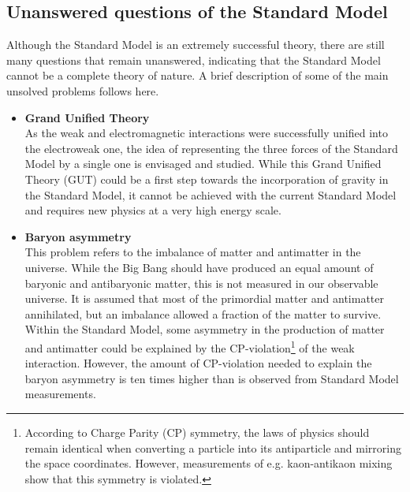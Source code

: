 \subsection{Unanswered questions of the Standard Model}

Although the Standard Model is an extremely successful theory, there are still many questions that remain unanswered, indicating that the Standard Model cannot be a complete theory of nature. A brief description of some of the main unsolved problems follows here.
\begin{itemize}
 \item[] \textbf{Grand Unified Theory}\\
 As the weak and electromagnetic interactions were successfully unified into the electroweak one, the idea of representing the three forces of the Standard Model by a single one is envisaged and studied. While this Grand Unified Theory (GUT) could be a first step towards the incorporation of gravity in the Standard Model, it cannot be achieved with the current Standard Model and requires new physics at a very high energy scale.
 
 \item[]\textbf{Baryon asymmetry}\\ 
 This problem refers to the imbalance of matter and antimatter in the universe. While the Big Bang should have produced an equal amount of baryonic and antibaryonic matter, this is not measured in our observable universe. It is assumed that most of the primordial matter and antimatter annihilated, but an imbalance allowed a fraction of the matter to survive. Within the Standard Model, some asymmetry in the production of matter and antimatter could be explained by the CP-violation\footnote{According to Charge Parity (CP) symmetry, the laws of physics should remain identical when converting a particle into its antiparticle and mirroring the space coordinates. However, measurements of e.g. kaon-antikaon mixing show that this symmetry is violated.} of the weak interaction. However, the amount of CP-violation needed to explain the baryon asymmetry is ten times higher than is observed from Standard Model measurements. 
 

\end{itemize}
